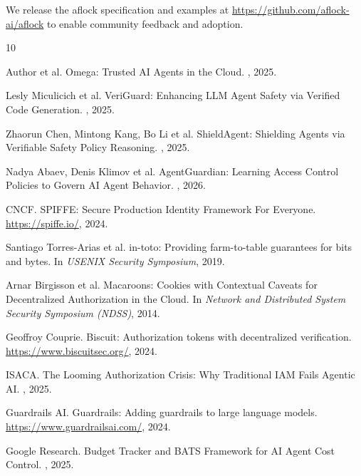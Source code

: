 \documentclass[11pt,a4paper]{article}
\begin{document}
We release the aflock specification and examples at \url{https://github.com/aflock-ai/aflock} to enable community feedback and adoption.


\begin{thebibliography}{10}

Author et al.
\newblock Omega: Trusted AI Agents in the Cloud.
, 2025.

Lesly Miculicich et al.
\newblock VeriGuard: Enhancing LLM Agent Safety via Verified Code Generation.
, 2025.

Zhaorun Chen, Mintong Kang, Bo Li et al.
\newblock ShieldAgent: Shielding Agents via Verifiable Safety Policy Reasoning.
, 2025.

Nadya Abaev, Denis Klimov et al.
\newblock AgentGuardian: Learning Access Control Policies to Govern AI Agent Behavior.
, 2026.

CNCF.
\newblock SPIFFE: Secure Production Identity Framework For Everyone.
\newblock \url{https://spiffe.io/}, 2024.

Santiago Torres-Arias et al.
\newblock in-toto: Providing farm-to-table guarantees for bits and bytes.
\newblock In {\em USENIX Security Symposium}, 2019.

Arnar Birgisson et al.
\newblock Macaroons: Cookies with Contextual Caveats for Decentralized Authorization in the Cloud.
\newblock In {\em Network and Distributed System Security Symposium (NDSS)}, 2014.

Geoffroy Couprie.
\newblock Biscuit: Authorization tokens with decentralized verification.
\newblock \url{https://www.biscuitsec.org/}, 2024.

ISACA.
\newblock The Looming Authorization Crisis: Why Traditional IAM Fails Agentic AI.
, 2025.

Guardrails AI.
\newblock Guardrails: Adding guardrails to large language models.
\newblock \url{https://www.guardrailsai.com/}, 2024.

Google Research.
\newblock Budget Tracker and BATS Framework for AI Agent Cost Control.
, 2025.

\end{thebibliography}
\end{document}
